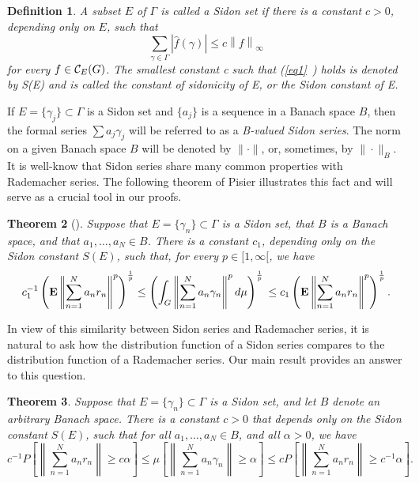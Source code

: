 \newtheorem{defsidon}{Definition}[section]
\begin{defsidon}
A subset $E$ of $\Gamma$ is called a Sidon set if there is a
constant $c > 0$, depending only on $E$, such that
\begin{equation}
\sum_{\gamma \in \Gamma} \left|\hat{f}(\gamma )\right|
\leq
c\left\| f\right\|_{\infty}
\label{eq1}
\end{equation}
for every $f \in {\cal C}_E(G)$.
The smallest constant c such that (\ref{eq1}\ ) holds is denoted by S(E)
and is called the constant of sidonicity of E, or the Sidon constant of
E.
\label{defsidon}
\end{defsidon}
If $E = \{ \gamma_j\} \subset \Gamma$ is a Sidon set and $\{ a_j\}$ is a
sequence in a Banach space $B$, then the formal series $\sum a_j\gamma_j$
will be referred to as a {\em B-valued Sidon series}.  The norm on a
given Banach space $B$ will be denoted by $\| \cdot \|$, or, sometimes,
by
$\| \cdot \|_B$. \\
It is well-know that Sidon series
share many common properties with Rademacher series.  The following
theorem of Pisier illustrates this fact and will serve as a crucial tool
in our proofs.

\newtheorem{th:Pis1}[defsidon]{Theorem}
\begin{th:Pis1}[{\cite[Th\'eor\`eme 2.1]{bib:Pi1}}]
Suppose that $E = \{ \gamma_n \} \subset \Gamma $ is a Sidon set, that
$B$ is a Banach space, and that $a_1, \ldots, a_N \in B$.  There is a
constant $c_1$, depending only on the Sidon constant $S(E)$, such that,
for every $p \in [1, \infty [$, we have
\begin{equation}
c_1^{-1}\left( {\bf E}\left\| \sum_{n=1}^N
a_nr_n \right\|^p\right)^{\frac{1}{p}}
\leq
\left( \int_G \left\| \sum_{n=1}^N
a_n \gamma_n \right\|^p d\mu \right)^{\frac{1}{p}}
\\
\leq
c_1 \left( {\bf E}\left\| \sum_{n=1}^N
a_nr_n \right\|^p\right)^{\frac{1}{p}}.
\label{ineq:Pis}
\end{equation}
\label{th:Pis1}
\end{th:Pis1}

In view of this similarity between Sidon series and Rademacher series, it
is natural to ask how the distribution function of a Sidon series
compares to the distribution function of a Rademacher series.  Our main
result provides an answer to this question.

\newtheorem{th:main}[defsidon]{Theorem}
\begin{th:main}
Suppose that $E = \{ \gamma_n\} \subset \Gamma$ is a Sidon set, and let
$B$ denote an arbitrary Banach space.  There is a constant $c > 0$ that
depends only on the Sidon constant $S(E)$, such that for all $a_1, \ldots
, a_N \in B$, and all $\alpha > 0$, we have
\begin{equation}
c^{-1}P\left[ \left\| \sum_{n=1}^N a_nr_n\right\|
\geq c\alpha \right]
\leq
\mu\left[ \left\| \sum_{n=1}^N a_n\gamma_n\right\|
\geq \alpha \right]
\leq
cP\left[ \left\| \sum_{n=1}^N a_nr_n\right\|
\geq c^{-1}\alpha \right].
\label{ineq:main}
\end{equation}


\label{th:main}
\end{th:main}

